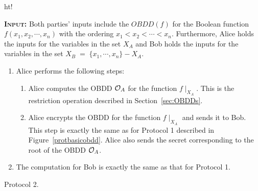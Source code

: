 \begin{center}
\begin{boxfig}{ht!}{
\textsc{\bf Input:} Both parties' inputs include the $OBDD(f)$ for the Boolean function
$f(x_1,x_2,\cdots,x_n)$ with the ordering $x_1 < x_2 < \cdots < x_n$.
Furthermore, Alice holds the inputs for the variables in the set $X_A$ and
Bob holds the inputs for the variables in the set $X_B \; = \; \{ x_1,\cdots,x_n \} - X_A$.
\vspace{1ex}
\begin{enumerate}
\item Alice performs the following steps:
\begin{enumerate}
\item Alice computes the OBDD ${\cal O}_A$ for the function $f \mid_{X_A}$. This is the restriction
operation described in Section~\ref{sec:OBDDs}.

\item Alice encrypts the OBDD for the function $f \mid_{X_A}$ and sends it to Bob. This
step is exactly the same as for Protocol 1 described in Figure~\ref{protbasicobdd}. Alice also sends
the secret corresponding to the root of the OBDD ${\cal O}_A$. 


\end{enumerate}

\item The computation for Bob is exactly the same as that for Protocol 1. 

\end{enumerate}
}
\vspace{-0.1cm}
\caption{\label{fig:protocol2} Protocol 2.}
\end{boxfig}
\end{center}


